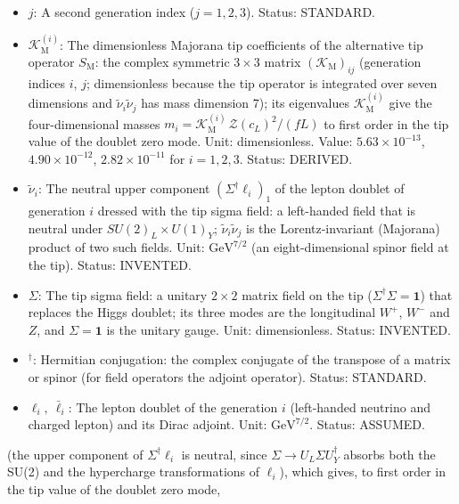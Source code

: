 \documentclass[
  10pt,
]{article}
\begin{document}
\begin{itemize}
  \(i\): The generation index (\(i = 1, 2, 3\)), which also labels the
  neutrino mass states \(\nu_1, \nu_2, \nu_3\); a repeated index is not
  summed unless a sum sign is written. Status: STANDARD.
\item
  \(j\): A second generation index (\(j = 1, 2, 3\)). Status: STANDARD.
\item
  \(\mathcal{K}_{\mathrm{M}}^{(i)}\): The dimensionless Majorana tip
  coefficients of the alternative tip operator \(S_{\mathrm{M}}\): the
  complex symmetric \(3\times3\) matrix
  \((\mathcal{K}_{\mathrm{M}})_{ij}\) (generation indices \(i\), \(j\);
  dimensionless because the tip operator is integrated over seven
  dimensions and \(\tilde\nu_i\tilde\nu_j\) has mass dimension 7); its
  eigenvalues \(\mathcal{K}_{\mathrm{M}}^{(i)}\) give the
  four-dimensional masses
  \(m_i = \mathcal{K}_{\mathrm{M}}^{(i)}\,\mathcal{Z}(c_L)^2/(fL)\) to
  first order in the tip value of the doublet zero mode. Unit:
  dimensionless. Value: \(5.63\times10^{-13}\), \(4.90\times10^{-12}\),
  \(2.82\times10^{-11}\) for \(i = 1, 2, 3\). Status: DERIVED.
\item
  \(\tilde\nu_i\): The neutral upper component
  \((\Sigma^\dagger\ell_i)_1\) of the lepton doublet of generation \(i\)
  dressed with the tip sigma field: a left-handed field that is neutral
  under \(SU(2)_L\times U(1)_Y\); \(\tilde\nu_i\tilde\nu_j\) is the
  Lorentz-invariant (Majorana) product of two such fields. Unit:
  \(\mathrm{GeV}^{7/2}\) (an eight-dimensional spinor field at the tip).
  Status: INVENTED.
\item
  \(\Sigma\): The tip sigma field: a unitary \(2 \times 2\) matrix field
  on the tip (\(\Sigma^\dagger\Sigma = \mathbf{1}\)) that replaces the
  Higgs doublet; its three modes are the longitudinal \(W^+\), \(W^-\)
  and \(Z\), and \(\Sigma = \mathbf{1}\) is the unitary gauge. Unit:
  dimensionless. Status: INVENTED.
\item
  \({}^\dagger\): Hermitian conjugation: the complex conjugate of the
  transpose of a matrix or spinor (for field operators the adjoint
  operator). Status: STANDARD.
\item
  \(\ell_i,\ \bar\ell_i\): The lepton doublet of the generation \(i\)
  (left-handed neutrino and charged lepton) and its Dirac adjoint. Unit:
  \(\mathrm{GeV}^{7/2}\). Status: ASSUMED.
\end{itemize}

(the upper component of \(\Sigma^\dagger\ell_i\) is neutral, since
\(\Sigma \to U_L\Sigma U_Y^\dagger\) absorbs both the SU(2) and the
hypercharge transformations of \(\ell_i\)), which gives, to first order
in the tip value of the doublet zero mode,
\end{document}
